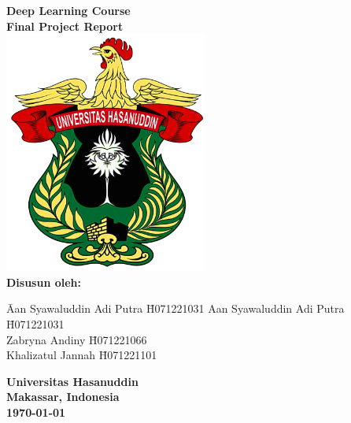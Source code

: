 \documentclass[12pt,a4paper]{article}
\begin{document}
\begin{titlepage}
    \centering
    \vspace*{1cm}

   

    {\LARGE \textbf{Deep Learning Course}}\\[0.5cm]
    {\Large \textbf{Final Project Report}}\\[1.5cm]

     \includegraphics[width=0.5\textwidth]{images/Logo-Resmi-Unhas-2.png}\\[1cm] %
    
    \textbf{Disusun oleh:}\\[0.5cm]
    \begin{tabbing}
        \hspace{3cm} \= Aan Syawaluddin Adi Putra \hspace{3cm} \= H071221031 \kill
        \> Aan Syawaluddin Adi Putra \hspace{1cm} \= H071221031 \\
        \> Zabryna Andiny \hspace{3.15cm} \= H071221066 \\
        \> Khalizatul Jannah \hspace{2.8cm} \= H071221101 \\
    \end{tabbing}
    
    \vfill
    
    \textbf{Universitas Hasanuddin}\\
    \textbf{Makassar, Indonesia}\\[0.5cm]
    \textbf{\today}
    
\end{titlepage}
\end{document}
